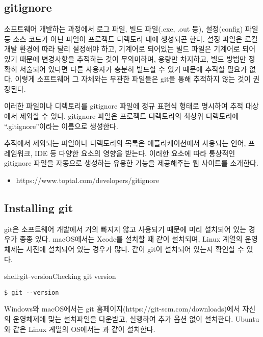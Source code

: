 \subsection*{gitignore}

소프트웨어 개발하는 과정에서 로그 파일, 빌드 파일(.exe, .out 등), 설정(config) 파일 등 소스 코드가 아닌 파일이 프로젝트 디렉토리 내에 생성되곤 한다. 설정 파일은 로컬 개발 환경에 따라 달리 설정해야 하고, 기계어로 되어있는 빌드 파일은 기계어로 되어있기 때문에 변경사항을 추적하는 것이 무의미하며, 용량만 차지하고, 빌드 방법만 정확히 서술되어 있다면 다른 사용자가 충분히 빌드할 수 있기 때문에 추적할 필요가 없다. 이렇게 소프트웨어 그 자체와는 무관한 파일들은 git을 통해 추적하지 않는 것이 권장된다.

이러한 파일이나 디렉토리를 gitignore 파일에 정규 표현식 형태로 명시하여 추적 대상에서 제외할 수 있다. gitignore 파일은 프로젝트 디렉토리의 최상위 디렉토리에 ``.gitignore''이라는 이름으로 생성한다.

추적에서 제외되는 파일이나 디렉토리의 목록은 애플리케이션에서 사용되는 언어, 프레임워크, IDE 등 다양한 요소의 영향을 받는다. 이러한 요소에 따라 통상적인 gitignore 파일을 자동으로 생성하는 유용한 기능을 제공해주는 웹 사이트를 소개한다.

\begin{itemize}
    \item https://www.toptal.com/developers/gitignore
\end{itemize}

\subsection*{Installing git}

git은 소프트웨어 개발에서 거의 빠지지 않고 사용되기 때문에 미리 설치되어 있는 경우가 종종 있다. macOS에서는 Xcode를 설치할 때 같이 설치되며, Linux 계열의 운영체제는 사전에 설치되어 있는 경우가 많다. \과 같이 git이 설치되어 있는지 확인할 수 있다.

\begin{shellenv}{shell:git-version}{Checking git version}\begin{verbatim}
$ git --version
\end{verbatim}
\end{shellenv}

Windows와 macOS에서는 git 홈페이지(https://git-scm.com/downloads)에서 자신의 운영체제에 맞는 설치파일을 다운받고, 실행하여 추가 옵션 없이 설치한다. Ubuntu와 같은 Linux 계열의 OS에서는 과 같이 설치한다.

